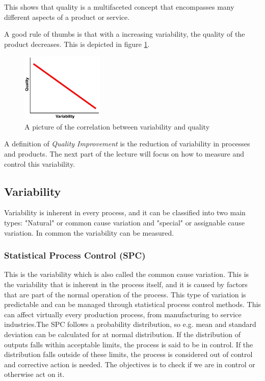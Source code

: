 This shows that quality is a multifaceted concept that encompasses many different aspects of a product or service.

A good rule of thumbs is that with a increasing variability, the quality of the product decreases. This is depicted in figure \ref{fig:qualVSvar}.
\begin{figure}[h]
    \centering
    \includegraphics[width=0.35\textwidth]{Figures/qualVSvar.JPG}
    \caption{A picture of the correlation between variability and quality}
    \label{fig:qualVSvar}
\end{figure}

\vspace{2\baselineskip}

A definition of \textit{Quality Improvement} is the reduction of variability in processes and products. The next part of the lecture will focus on how to measure and control this variability.

\subsection{Variability}    
Variability is inherent in every process, and it can be classified into two main types: "Natural" or common cause variation and "special" or assignable cause variation. In common the variability can be measured. 
\subsubsection{Statistical Process Control (SPC)}
This is the variability which is also called the common cause variation. This is the variability that is inherent in the process itself, and it is caused by factors that are part of the normal operation of the process. This type of variation is predictable and can be managed through statistical process control methods. This can affect virtually every production process, from manufacturing to service industries.The SPC follows a probability distribution, so e.g. mean and standard deviation can be calculated for at normal distribution. If the distribution of outputs falls within acceptable limits, the process is said to be in control. If the distribution falls outside of these limits, the process is considered out of control and corrective action is needed. The objectives is to check if we are in control or otherwise act on it.

